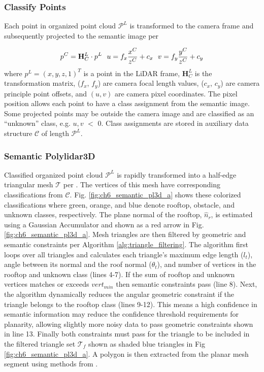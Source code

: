 \subsubsection{Classify Points}
Each point in organized point cloud $\mathcal{P}^L$ is transformed to the camera frame and subsequently projected to the semantic image per

\begin{equation}
 \label{eq:transform_points} 
    p^{C} = \mathbf{H}^L_C \cdot p^{L} \\
    \ \ u = f_{x} \frac{x^{C}}{z^{C}}+c_{x} \\
    \ \ v = f_{y} \frac{y^{C}}{z^{C}}+c_{y}  
\end{equation}
where $p^{L} = (x,y,z,1)^T$ is a point in the LiDAR frame, $ \mathbf{H}^L_C$ is the transformation matrix, ($f_x$, $f_y$) are camera focal length values, ($c_x$, $c_y$) are camera principle point offsets, and $(u,v)$ are camera pixel coordinates.  The pixel position allows each point to have a class assignment from the semantic image. Some projected points may be outside the camera image and are classified as an ``unknown'' class, e.g. $u,v$ $<$ 0. Class assignments are stored in auxiliary data structure $\mathcal{C}$ of length $\mathcal{P}^L$.

\subsubsection{Semantic Polylidar3D} \label{sec:ch6_methods_semantic_polylidar3d}

Classified organized point cloud $\mathcal{P}^L$ is rapidly transformed into a half-edge triangular mesh $\mathcal{T}$  per \cite{castagno_polylidar3d_2020}. The vertices of this mesh have corresponding classifications from $\mathcal{C}$. Fig. \ref{fig:ch6_semantic_pl3d_a} shows these colorized classifications where green, orange, and blue denote rooftop, obstacle, and unknown classes, respectively. The plane normal of the rooftop, $\hat{n}_r$, is estimated using a Gaussian Accumulator\cite{castagno_polylidar3d_2020} and shown as a red arrow in Fig. \ref{fig:ch6_semantic_pl3d_a}. Mesh triangles are then filtered by geometric and semantic constraints per Algorithm \ref{alg:triangle_filtering}. The algorithm first loops over all triangles and calculates each triangle's maximum edge length ($l_t$), angle between its normal and the roof normal ($\theta_t$), and number of vertices in the rooftop and unknown class (lines 4-7). If the sum of rooftop and unknown vertices matches or exceeds $vert_{min}$ then semantic constraints pass (line 8). Next, the algorithm dynamically reduces the angular geometric constraint if the triangle belongs to the rooftop class (lines 9-12). This means a high confidence in semantic information may reduce the confidence threshold requirements for planarity, allowing slightly more noisy data to pass geometric constraints shown in line 13. Finally both constraints must pass for the triangle to be included in the filtered triangle set $\mathcal{T}_f$ shown as shaded blue triangles in Fig \ref{fig:ch6_semantic_pl3d_a}. A polygon is then extracted from the planar mesh segment using methods from \cite{castagno_polylidar3d_2020}.

